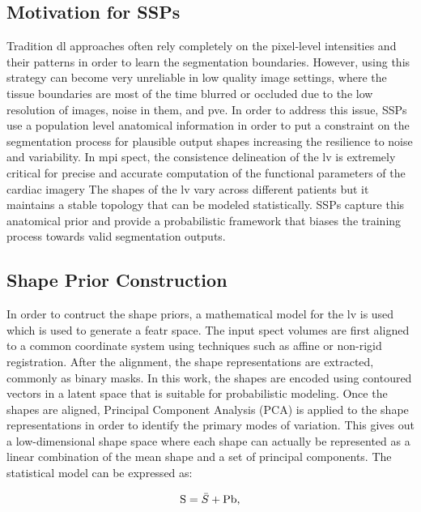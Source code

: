 \subsection{Motivation for SSPs}
Tradition \gls{dl} approaches often rely completely on the pixel-level intensities and their patterns in order to learn the segmentation boundaries. However, using this strategy can become very unreliable in low quality image settings, where the tissue boundaries are most of the time blurred or occluded due to the low resolution of images, noise in them, and \gls{pve}. In order to address this issue, SSPs use a population level anatomical information in order to put a constraint on the segmentation process for plausible output shapes increasing the resilience to noise and variability. In \gls{mpi} \gls{spect}, the consistence delineation of the \gls{lv} is extremely critical for precise and accurate computation of the functional parameters of the cardiac imagery The shapes of the \gls{lv} vary across different patients but it maintains a stable topology that can be modeled statistically. SSPs capture this anatomical prior and provide a probabilistic framework that biases the training process towards valid segmentation outputs.

\subsection{Shape Prior Construction}
In order to contruct the shape priors, a mathematical model for the \gls{lv} is used which is used to generate a featr space. The input \gls{spect} volumes are first aligned to a common coordinate system using techniques such as affine or non-rigid registration. After the alignment, the shape representations are extracted, commonly as binary masks. In this work, the shapes are encoded using contoured vectors in a latent space that is suitable for probabilistic modeling. Once the shapes are aligned, Principal Component Analysis (PCA) is applied to the shape representations in order to identify the primary modes of variation. This gives out a low-dimensional shape space where each shape can actually be represented as a linear combination of the mean shape and a set of principal components. The statistical model can be expressed as:

\begin{equation} 
\addcontentsline{equ}{equations}{\protect\numberline{\theequation}Statistical Shape Model}
\text{S} = \bar{S} + \text{Pb}, 
\end{equation} 

